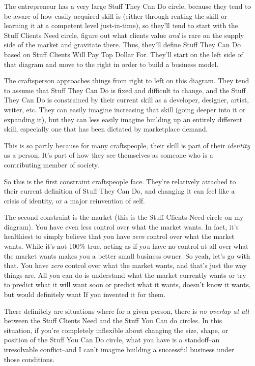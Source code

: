 The entrepreneur has a very large Stuff They Can Do circle, because they tend to be aware of how easily acquired skill is (either through renting the skill or learning it at a competent level just-in-time), so they'll tend to start with the Stuff Clients Need circle, figure out what clients value \emph{and} is rare on the supply side of the market and gravitate there. Thus, they'll define Stuff They Can Do based on Stuff Clients Will Pay Top Dollar For. They'll start on the left side of that diagram and move to the right in order to build a business model.

The craftsperson approaches things from right to left on this diagram. They tend to assume that Stuff They Can Do is fixed and difficult to change, and the Stuff They Can Do is constrained by their current skill as a developer, designer, artist, writer, etc. They can easily imagine increasing that skill (going deeper into it or expanding it), but they can less easily imagine building up an entirely different skill, especially one that has been dictated by marketplace demand.

This is so partly because for many craftspeople, their skill is part of their \emph{identity} as a person. It's part of how they see themselves as someone who is a contributing member of society.

So this is the first constraint craftspeople face. They're relatively attached to their current definition of Stuff They Can Do, and changing it can feel like a crisis of identity, or a major reinvention of self.

The second constraint is the market (this is the Stuff Clients Need circle on my diagram). You have even less control over what the market wants. In fact, it's healthiest to simply believe that you have \emph{zero} control over what the market wants. While it's not 100\% true, acting as if you have no control at all over what the market wants makes you a better small business owner. So yeah, let's go with that. You have \emph{zero} control over what the market wants, and that's just the way things are. All you can do is understand what the market currently wants or try to predict what it will want soon or predict what it wants, doesn’t know it wants, but would definitely want If you invented it for them.

There definitely are situations where for a given person, there is \emph{no overlap at all} between the Stuff Clients Need and the Stuff You Can do circles. In this situation, if you're completely inflexible about changing the size, shape, or position of the Stuff You Can Do circle, what you have is a standoff--an irresolvable conflict--and I can't imagine building a successful business under those conditions.

